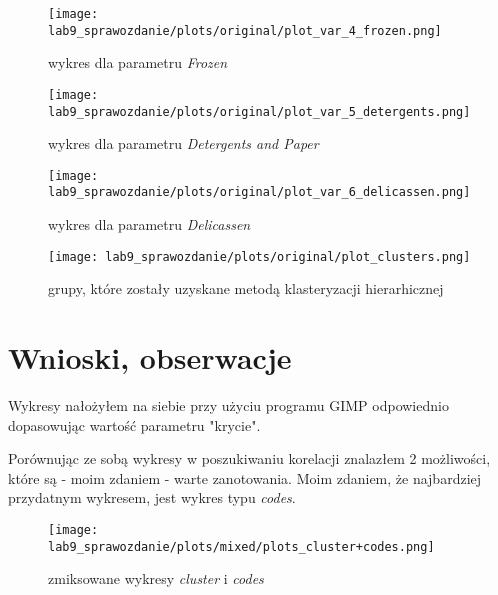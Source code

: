 \documentclass[a4paper,12pt]{article}
\theoremstyle{mytheor}
\begin{document}
\begin{figure}[H]
    \centering
    \texttt{[image: lab9\_sprawozdanie/plots/original/plot\_var\_4\_frozen.png]}
    \caption{wykres dla parametru \emph{Frozen}}
    \label{fig:plot8}
\end{figure}

\begin{figure}[H]
    \centering
    \texttt{[image: lab9\_sprawozdanie/plots/original/plot\_var\_5\_detergents.png]}
    \caption{wykres dla parametru \emph{Detergents and Paper}}
    \label{fig:plot9}
\end{figure}

\begin{figure}[H]
    \centering
    \texttt{[image: lab9\_sprawozdanie/plots/original/plot\_var\_6\_delicassen.png]}
    \caption{wykres dla parametru \emph{Delicassen}}
    \label{fig:plot10}
\end{figure}

\begin{figure}[H]
    \centering
    \texttt{[image: lab9\_sprawozdanie/plots/original/plot\_clusters.png]}
    \caption{grupy, które zostały uzyskane metodą klasteryzacji hierarhicznej}
    \label{fig:plot11}
\end{figure}

\section*{Wnioski, obserwacje}

Wykresy nałożyłem na siebie przy użyciu programu GIMP odpowiednio dopasowując wartość parametru "krycie".

Porównując ze sobą wykresy w poszukiwaniu korelacji znalazłem 2 możliwości, które są - moim zdaniem - warte zanotowania. Moim zdaniem, że najbardziej przydatnym wykresem, jest wykres typu \emph{codes}.

\begin{figure}[H]
    \centering
    \texttt{[image: lab9\_sprawozdanie/plots/mixed/plots\_cluster+codes.png]}
    \caption{zmiksowane wykresy \emph{cluster} i \emph{codes}}
    \label{fig:plot12}
\end{figure}
\end{document}

